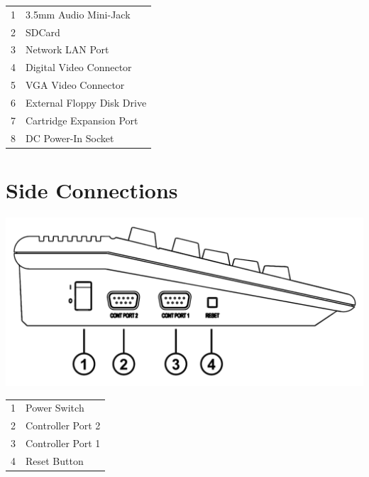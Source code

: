 \begin{center}
\begin{longtable}{ c | l}

	1	& 	3.5mm Audio Mini-Jack \\
	2	& 	SDCard \\
	3	& 	Network LAN Port \\
	4	& 	Digital Video Connector \\
	5	& 	VGA Video Connector \\
	6	& 	External Floppy Disk Drive	\\
	7	& 	Cartridge Expansion Port \\
	8	& 	DC Power-In Socket	 \\

\end{longtable}
\end{center}

\newpage

\section{Side Connections}

\includegraphics[width=\linewidth]{images/illustrations/mega65-side.pdf}

\begin{center}
\begin{longtable}{ c | l}

	1	& 	Power Switch \\
	2	& 	Controller Port 2 \\
	3	& 	Controller Port 1 \\
	4	& 	Reset Button \\

\end{longtable}
\end{center}

